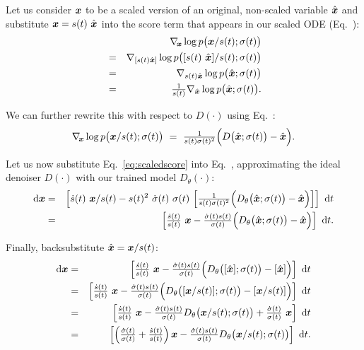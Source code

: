 Let us consider $\boldsymbol{x}$ to be a scaled version of an original, non-scaled variable $\hat{\boldsymbol{x}}$ and substitute $\boldsymbol{x} = s(t) ~\hat{\boldsymbol{x}}$ into the score term that appears in our scaled ODE (Eq.~):
\begin{eqnarray}
  && \nabla_{\hspace{-0.5mm}\boldsymbol{x}} \log p\big( \boldsymbol{x} / s(t); \sigma(t) \big) \\
  &=& \nabla_{[ s(t) \hat {\boldsymbol{x}} ]} \log p\big( [s(t) ~\hat{\boldsymbol{x}}] / s(t); \sigma(t) \big) \\
  &=& \nabla_{s(t) \hat {\boldsymbol{x}}} \log p\big( \hat{\boldsymbol{x}}; \sigma(t) \big) \\
  &=& \tfrac{1}{s(t)} \nabla_{\hat{\boldsymbol{x}}} \log p\big( \hat{\boldsymbol{x}}; \sigma(t) \big)
  \text{.}
\end{eqnarray}

We can further rewrite this with respect to $D(\cdot)$ using Eq.~:
\begin{equation}
  \nabla_{\hspace{-0.5mm}\boldsymbol{x}} \log p\big( \boldsymbol{x} / s(t); \sigma(t) \big) ~=~ \tfrac{1}{s(t) \sigma(t)^2} \Big( D\big( \hat{\boldsymbol{x}}; \sigma(t) \big) - \hat{\boldsymbol{x}} \Big)
  \label{eq:scaledscore}
  \text{.}
\end{equation}

Let us now substitute Eq.~\ref{eq:scaledscore} into Eq.~, approximating the ideal denoiser $D(\cdot)$ with our trained model $D_\theta(\cdot)$:
\begin{eqnarray}
  \mathrm{d}\boldsymbol{x} &=& \left[ \dot s(t) ~\boldsymbol{x} / s(t) - s(t)^2 ~\dot\sigma(t) ~\sigma(t) ~\Big[ \tfrac{1}{s(t) \sigma(t)^2} \Big( D_\theta \big( \hat{\boldsymbol{x}}; \sigma(t) \big) - \hat{\boldsymbol{x}} \Big) \Big] \right] ~\mathrm{d} t \\
  &=& \left[ \tfrac{\dot s(t)}{s(t)} ~\boldsymbol{x} - \tfrac{\dot\sigma(t) s(t)}{\sigma(t)} \Big( D_\theta \big( \hat{\boldsymbol{x}}; \sigma(t) \big) - \hat{\boldsymbol{x}} \Big) \right] ~\mathrm{d} t
  \text{.}
\end{eqnarray}

Finally, backsubstitute $\hat{\boldsymbol{x}} = \boldsymbol{x} / s(t)$:
\begin{eqnarray}
  \mathrm{d}\boldsymbol{x} &=& \left[ \tfrac{\dot s(t)}{s(t)} ~\boldsymbol{x} - \tfrac{\dot\sigma(t) s(t)}{\sigma(t)} \Big( D_\theta \big( [\hat{\boldsymbol{x}}]; \sigma(t) \big) - [\hat{\boldsymbol{x}}] \Big) \right] ~\mathrm{d} t \\
  &=& \left[ \tfrac{\dot s(t)}{s(t)} ~\boldsymbol{x} - \tfrac{\dot\sigma(t) s(t)}{\sigma(t)} \Big( D_\theta \big( [\boldsymbol{x} / s(t)]; \sigma(t) \big) - [\boldsymbol{x} / s(t)] \Big) \right] ~\mathrm{d} t \\
  &=& \left[ \tfrac{\dot s(t)}{s(t)} ~\boldsymbol{x} - \tfrac{\dot\sigma(t) s(t)}{\sigma(t)} D_\theta \big( \boldsymbol{x} / s(t); \sigma(t) \big) + \tfrac{\dot\sigma(t)}{\sigma(t)} ~\boldsymbol{x} \right] ~\mathrm{d} t \\
  &=& \left[ \left( \tfrac{\dot\sigma(t)}{\sigma(t)} + \tfrac{\dot s(t)}{s(t)} \right) \boldsymbol{x} - \tfrac{\dot\sigma(t) s(t)}{\sigma(t)} D_\theta \big( \boldsymbol{x} / s(t); \sigma(t) \big) \right] ~\mathrm{d} t
  \label{eq:practicalode}
  \text{.}
\end{eqnarray}


